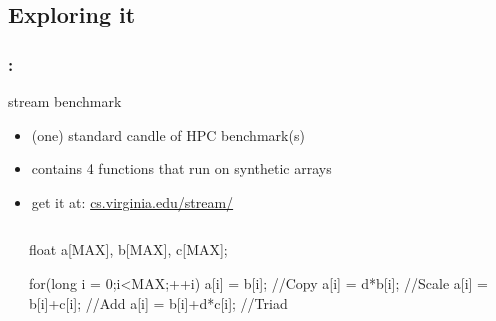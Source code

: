 \documentclass[9pt,xcolor=table]{beamer}
\begin{document}
\subsection{Exploring it}
\begin{frame}[fragile]
\frametitle{\insertsectionhead{}: \insertsubsection{}}
\vfill
\begin{block}{stream benchmark \cite{McCalpin1995,McCalpin2007}}
  \begin{itemize}
  \item (one) standard candle of HPC benchmark(s)
  \item contains 4 functions that run on synthetic arrays 
  \item get it at: \href{http://www.cs.virginia.edu/stream/}{cs.virginia.edu/stream/}
  \end{itemize}
\end{block}
\begin{columns}
  \begin{column}{.17\textwidth}
    \hfill
  \end{column}
  \begin{column}{.6\textwidth}
    \begin{pyglist}[language=c++,numbers=left,style=emacs,fontsize=\large]
      float a[MAX], b[MAX], c[MAX];
  
      for(long i = 0;i<MAX;++i) { 
        a[i] = b[i]; //Copy 
        a[i] = d*b[i]; //Scale 
        a[i] = b[i]+c[i]; //Add 
        a[i] = b[i]+d*c[i]; //Triad 
      }
    \end{pyglist}
  \end{column}
  \begin{column}{.17\textwidth}
    \hfill
  \end{column}
\end{columns}
\vfill
\end{frame}
\end{document}
